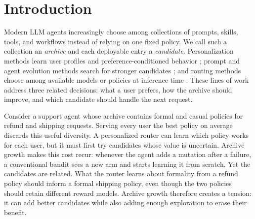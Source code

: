 \documentclass{article} %
\begin{document}
\begin{abstract}
Building on this base, we introduce \emph{Hyper-Ridge PersonalEvo}, which replaces independent isotropic regularization with a shared archive geometry. We prove an effective-dimension exploration guarantee when that geometry is known. For a calibration-split variant that estimates and then freezes the geometry, we also prove finite-sample covariance control; under an additional calibrated-confidence condition, its charged estimation remainder is sub-$\sqrt{T}$. Diagnostic experiments separate the geometric mechanism from the unresolved estimator: on planted rank-three problems, the true geometry lowers cumulative exploration cost by $46$--$59\%$, whereas the periodically re-estimated geometry raises it by $7$--$19\%$. Thus the current evidence supports the known-geometry mechanism, but not yet the fully adaptive router.
\end{abstract}

\section{Introduction}

\label{sec:intro}

Modern LLM agents increasingly choose among collections of prompts, skills, tools, and workflows instead of relying on one fixed policy. We call such a collection an \emph{archive} and each deployable entry a \emph{candidate}. Personalization methods learn user profiles and preference-conditioned behavior \citep{salemi2023lamp,zhao2025prefeval,jin2026personalizing}; prompt and agent evolution methods search for stronger candidates \citep{fernando2023promptbreeder,guo2024evoprompt,zhou2024symbolic,agrawal2025geparp}; and routing methods choose among available models or policies at inference time \citep{ong2024routellm,hu2024routerbench,li2025llmbandit,tsai2026neuralucb}. These lines of work address three related decisions: what a user prefers, how the archive should improve, and which candidate should handle the next request.

Consider a support agent whose archive contains formal and casual policies for refund and shipping requests. Serving every user the best policy on average discards this useful diversity. A personalized router can learn which policy works for each user, but it must first try candidates whose value is uncertain. Archive growth makes this cost recur: whenever the agent adds a mutation after a failure, a conventional bandit sees a new arm and starts learning it from scratch. Yet the candidates are related. What the router learns about formality from a refund policy should inform a formal shipping policy, even though the two policies should retain different reward models. Archive growth therefore creates a tension: it can add better candidates while also adding enough exploration to erase their benefit.
\end{document}
